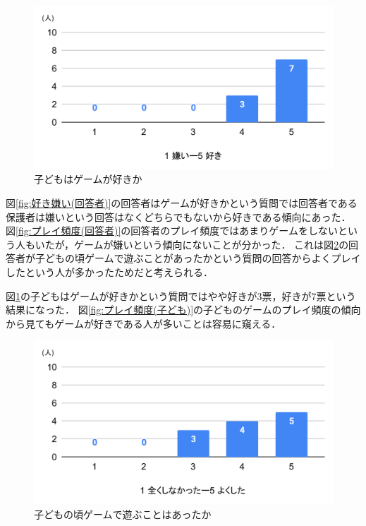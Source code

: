 \documentclass[12pt,a4j,titlepage]{ltjsarticle}
\begin{document}
\begin{figure}[H]
 \begin{center}
  \includegraphics[keepaspectratio, scale=0.6]{PDF/chart5.pdf}
 \end{center}
 \caption{子どもはゲームが好きか}
 \label{fig:好き嫌い(子ども)}
\end{figure}

図\ref{fig:好き嫌い(回答者)}の回答者はゲームが好きかという質問では回答者である保護者は嫌いという回答はなくどちらでもないから好きである傾向にあった．
図\ref{fig:プレイ頻度(回答者)}の回答者のプレイ頻度ではあまりゲームをしないという人もいたが，ゲームが嫌いという傾向にないことが分かった．
これは図\ref{fig:子どものころ}の回答者が子どもの頃ゲームで遊ぶことがあったかという質問の回答からよくプレイしたという人が多かったためだと考えられる．

図\ref{fig:好き嫌い(子ども)}の子どもはゲームが好きかという質問ではやや好きが3票，好きが7票という結果になった．
図\ref{fig:プレイ頻度(子ども)}の子どものゲームのプレイ頻度の傾向から見てもゲームが好きである人が多いことは容易に窺える．

\begin{figure}[H]
 \begin{center}
  \includegraphics[keepaspectratio, scale=0.6]{PDF/chart6.pdf}
 \end{center}
 \caption{子どもの頃ゲームで遊ぶことはあったか}
 \label{fig:子どものころ}
\end{figure}
\end{document}
